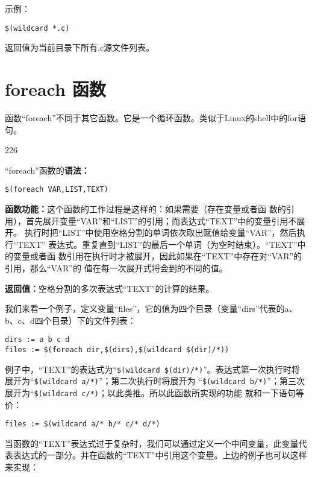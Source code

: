示例：
\begin{Verbatim}[]
$(wildcard *.c)
\end{Verbatim}

返回值为当前目录下所有.c源文件列表。

\section{foreach 函数}
函数“foreach”不同于其它函数。它是一个循环函数。类似于Linux的shell中的for语句。

\begin{dinglist}{226}
\itemsep=4pt \parskip=0pt

\item “foreach”函数的\textbf{语法：}

\begin{Verbatim}[]
$(foreach VAR,LIST,TEXT)
\end{Verbatim}


\item \textbf{函数功能：}这个函数的工作过程是这样的：如果需要（存在变量或者函
    数的引
    用），首先展开变量“VAR”和“LIST”的引用；而表达式“TEXT”中的变量引用不展开。
    执行时把“LIST”中使用空格分割的单词依次取出赋值给变量“VAR”，然后执行“TEXT”
    表达式。重复直到“LIST”的最后一个单词（为空时结束）。“TEXT”中的变量或者函
    数引用在执行时才被展开，因此如果在“TEXT”中存在对“VAR”的引用，那么“VAR”的
    值在每一次展开式将会到的不同的值。

\item \textbf{返回值：}空格分割的多次表达式“TEXT”的计算的结果。

\end{dinglist}

我们来看一个例子，定义变量“files”，它的值为四个目录（变量“dirs”代表的a、b、c、d四个目录）下的文件列表：

\begin{Verbatim}[]
dirs := a b c d
files := $(foreach dir,$(dirs),$(wildcard $(dir)/*))
\end{Verbatim}

例子中，“TEXT”的表达式为“\verb"$(wildcard $(dir)/*)"”。表达式第一次执行时将
展开为“\verb"$(wildcard a/*)"”；第二次执行时将展开为
“\verb"$(wildcard b/*)"”；第三次展开为“\verb"$(wildcard c/*)"；以此类推。所以此函数所实现的功能
就和一下语句等价：

\begin{Verbatim}[]
files := $(wildcard a/* b/* c/* d/*)
\end{Verbatim}

当函数的“TEXT”表达式过于复杂时，我们可以通过定义一个中间变量，此变量代表表达式的一部分。并在函数的“TEXT”中引用这个变量。上边的例子也可以这样来实现：


